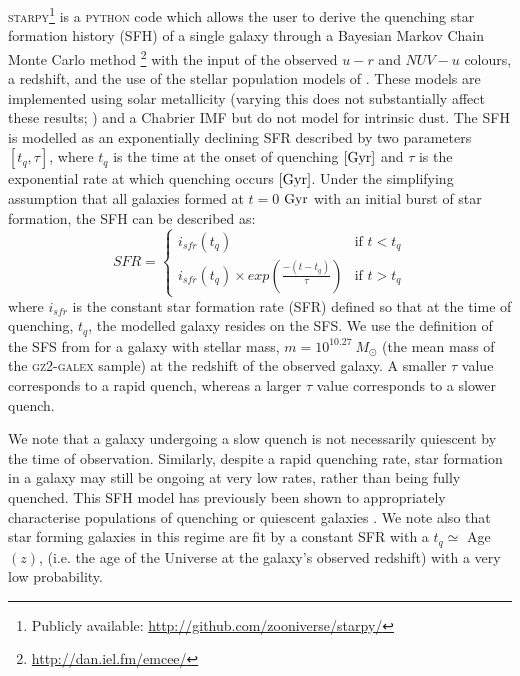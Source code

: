\documentclass[useAMS,usenatbib]{mn2e}
\begin{document}
\textsc{starpy}\footnote{Publicly available: \url{http://github.com/zooniverse/starpy/}} is a \textsc{python} code which allows the user to derive the quenching star formation history (SFH) of a single galaxy through a Bayesian Markov Chain Monte Carlo method \citep{emcee13}\footnote{\url{http://dan.iel.fm/emcee/}} with the input of the observed $u-r$ and $NUV-u$ colours, a redshift, and the use of the stellar population models of \cite{BC03}. These models are implemented using solar metallicity (varying this does not substantially affect these results; \citealt{smethurst15}) and a Chabrier IMF \citep{chabrier03} but do not model for intrinsic dust. The SFH is modelled as an exponentially declining SFR described by two parameters $[t_{q}, \tau]$, where $t_{q}$ is the time at the onset of quenching $\rm{[Gyr]}$ and $\tau$ is the exponential rate at which quenching occurs $\rm{[Gyr]}$. Under the simplifying assumption that all galaxies formed at $t=0$ $\rm{ Gyr}$ with an initial burst of star formation, the SFH can be described as: 
\begin{equation}\label{sfh}
SFR =
\begin{cases}
i_{sfr}(t_{q}) & \text{if } t < t_{q} \\
i_{sfr}(t_{q}) \times exp{\left( \frac{-(t-t_{q})}{\tau}\right)} & \text{if } t > t_{q} 
\end{cases}
\end{equation}
where $i_{sfr}$ is the constant star formation rate (SFR) defined so that at the time of quenching, $t_{q}$, the modelled galaxy resides on the SFS. We use the definition of the SFS from \cite{peng10} for a galaxy with stellar mass, $m = 10^{10.27}~M_{\odot}$ (the mean mass of the \textsc{gz2-galex} sample) at the redshift of the observed galaxy.  A smaller $\tau$ value corresponds to a rapid quench, whereas a larger $\tau$ value corresponds to a slower quench. 

We note that a galaxy undergoing a slow quench is not necessarily quiescent by the time of observation. Similarly, despite a rapid quenching rate, star formation in a galaxy may still be ongoing at very low rates, rather than being fully quenched. This SFH model has previously been shown to appropriately characterise populations of quenching or quiescent galaxies \citep{Weiner06, Martin07, Noeske07,schawinski14}. We note also that star forming galaxies in this regime are fit by a constant SFR with a $t_{q} \simeq$ Age$(z)$, (i.e. the age of the Universe at the galaxy's observed redshift) with a very low probability.
\end{document}
